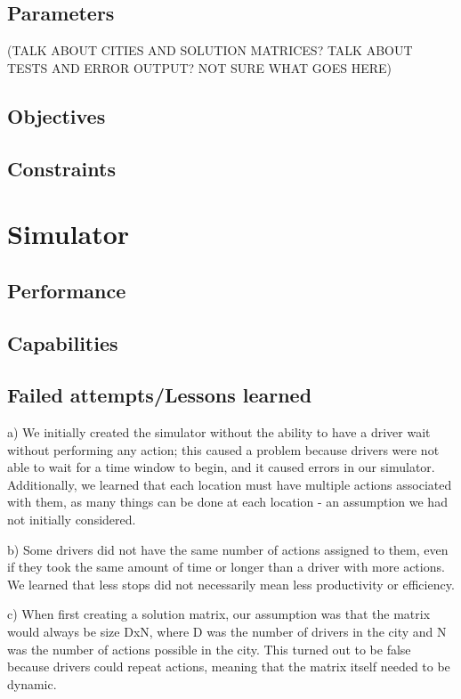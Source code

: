 \documentclass{article}
\begin{document}
\subsection{Parameters}
(TALK ABOUT CITIES AND SOLUTION MATRICES?  TALK ABOUT TESTS AND ERROR OUTPUT? NOT SURE WHAT GOES HERE)
\subsection{Objectives}

\subsection{Constraints}
\section{Simulator}
\subsection{Performance}
\subsection{Capabilities}
\subsection{Failed attempts/Lessons learned}

a) We initially created the simulator without the ability to have a driver wait without performing any action; this caused a problem because drivers were not able to wait for a time window to begin, and it caused errors in our simulator.  Additionally, we learned that each location must have multiple actions associated with them, as many things can be done at each location - an assumption we had not initially considered.

b) Some drivers did not have the same number of actions assigned to them, even if they took the same amount of time or longer than a driver with more actions.  We learned that less stops did not necessarily mean less productivity or efficiency.

c) When first creating a solution matrix, our assumption was that the matrix would always be size DxN, where D was the number of drivers in the city and N was the number of actions possible in the city.  This turned out to be false because drivers could repeat actions, meaning that the matrix itself needed to be dynamic.
\end{document}
